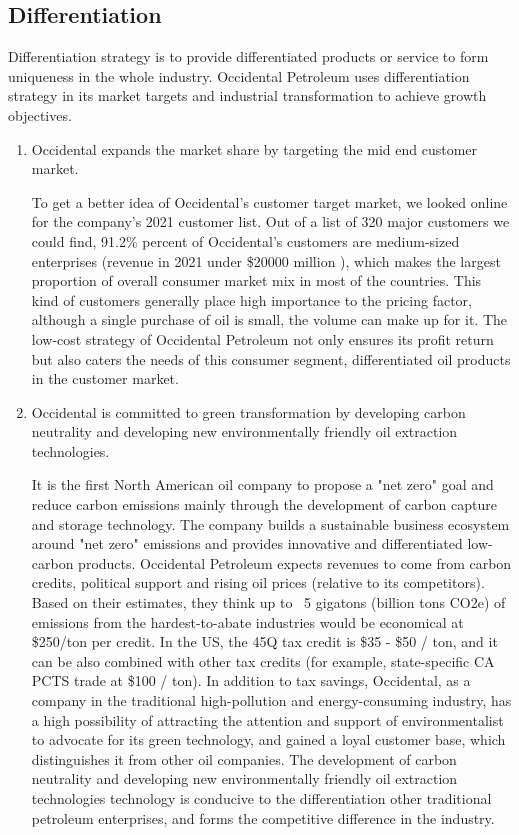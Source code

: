 \documentclass[
	a4paper, %
	12pt,%
]{CSSullivanBusinessReport}
\begin{document}
\begin{fullwidth}
\subsection{Differentiation}
Differentiation strategy is to provide differentiated products or service to form uniqueness in the whole industry. Occidental Petroleum uses differentiation strategy in its market targets and industrial transformation to achieve growth objectives.
\begin{enumerate}
    \item  Occidental expands the market share by targeting the mid end customer market.\par
    To get a better idea of Occidental's customer target market, we looked online for the company's 2021 customer list. Out of a list of 320 major customers we could find, 91.2\% percent of Occidental's customers are medium-sized enterprises (revenue in 2021 under \$20000 million ), which makes the largest proportion of overall consumer market mix in most of the countries. This kind of customers generally place high importance to the pricing factor, although a single purchase of oil is small, the volume can make up for it. The low-cost strategy of Occidental Petroleum not only ensures its profit return but also caters the needs of this consumer segment, differentiated oil products in the customer market.
    \item Occidental is committed to green transformation by developing carbon neutrality and developing new environmentally friendly oil extraction technologies. \par
    It is the first North American oil company to propose a "net zero" goal and reduce carbon emissions mainly through the development of carbon capture and storage technology. The company builds a sustainable business ecosystem around "net zero" emissions and provides innovative and differentiated low-carbon products. Occidental Petroleum expects revenues to come from carbon credits, political support and rising oil prices (relative to its competitors). Based on their estimates, they think up to ~5 gigatons (billion tons CO2e) of emissions from the hardest-to-abate industries would be economical at \$250/ton per credit.  In the US, the 45Q tax credit is \$35 - \$50 / ton, and it can be also combined with other tax credits (for example, state-specific CA PCTS trade at \$100 / ton). In addition to tax savings, Occidental, as a company in the traditional high-pollution and energy-consuming industry, has a high possibility of attracting the attention and support of environmentalist to advocate for its green technology, and gained a loyal customer base, which distinguishes it from other oil companies. The development of carbon neutrality and developing new environmentally friendly oil extraction technologies technology is conducive to the differentiation other traditional petroleum enterprises, and forms the competitive difference in the industry.
\end{enumerate}

\end{fullwidth}
\end{document}
